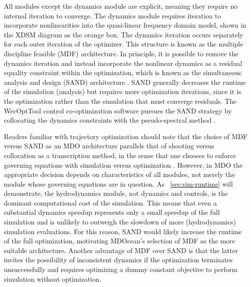 All modules except the dynamics module are explicit, meaning they require no internal iteration to converge.
The dynamics module requires iteration to incorporate nonlinearities into the quasi-linear frequency domain model, shown in the XDSM diagram as the orange box.
The dynamics iteration occurs separately for each outer iteration of the optimizer.
This structure is known as the multiple discipline feasible (MDF) architecture.
In principle, it is possible to remove the dynamics iteration and instead incorporate the nonlinear dynamics as a residual equality constraint within the optimization, which is known as the simultaneous analysis and design (SAND) architecture \cite{martins_multidisciplinary_2013}.
SAND generally decreases the runtime of the simulation (analysis) but requires more optimization iterations, since it is the optimization rather than the simulation that must converge residuals. 
The WecOptTool control co-optimization software pursues the SAND strategy by collocating the dynamics constraints with the pseudo-spectral method \cite{coe_initial_2020}.

Readers familiar with trajectory optimization should note that the choice of MDF versus SAND as an MDO architecture parallels that of shooting versus collocation as a transcription method, in the sense that one chooses to enforce governing equations with simulation versus optimization \cite{underactuated}.
However, in MDO the appropriate decision depends on characteristics of all modules, not merely the module whose governing equations are in question.
As \sectionautorefname~\ref{sec:sim-runtime} will demonstrate, the hydrodynamics module, not dynamics and controls, is the dominant computational cost of the simulation.
This means that even a substantial dynamics speedup represents only a small speedup of the full simulation and is unlikely to outweigh the slowdown of more (hydrodynamics) simulation evaluations.
For this reason, SAND would likely increase the runtime of the full optimization, motivating MDOcean's selection of MDF as the more suitable architecture.
Another advantage of MDF over SAND is that the latter invites the possibility of inconsistent dynamics if the optimization terminates unsuccessfully \cite{martins_multidisciplinary_2013} and requires optimizing a dummy constant objective to perform simulation without optimization.
